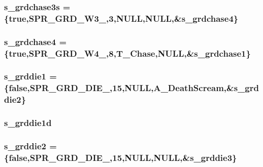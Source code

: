 \label{WL__ACT2_8C_a8bc87beffeb977a5c95f49302ac14a72}
\hypertarget{WL__ACT2_8C_add94e5dfbb86ff5e37cc5e00d5a09afe}{
\subsubsection[{s\_\-grdchase3s}]{ {\bf s\_\-grdchase3s} = \{true,SPR\_\-GRD\_\-W3\_,3,NULL,NULL,\&{\bf s\_\-grdchase4}\}}}
\label{WL__ACT2_8C_add94e5dfbb86ff5e37cc5e00d5a09afe}
\hypertarget{WL__ACT2_8C_a300ee63f6cbbc3b04ad6a46f8f553e5f}{
\subsubsection[{s\_\-grdchase4}]{ {\bf s\_\-grdchase4} = \{true,SPR\_\-GRD\_\-W4\_,8,T\_\-Chase,NULL,\&{\bf s\_\-grdchase1}\}}}
\label{WL__ACT2_8C_a300ee63f6cbbc3b04ad6a46f8f553e5f}
\hypertarget{WL__ACT2_8C_a24864a0aad4623326b4d7ca0ead6407e}{
\subsubsection[{s\_\-grddie1}]{ {\bf s\_\-grddie1} = \{false,SPR\_\-GRD\_\-DIE\_,15,NULL,A\_\-DeathScream,\&{\bf s\_\-grddie2}\}}}
\label{WL__ACT2_8C_a24864a0aad4623326b4d7ca0ead6407e}
\hypertarget{WL__ACT2_8C_a333b92e2a38649b0efd2140520af9558}{
\subsubsection[{s\_\-grddie1d}]{ {\bf s\_\-grddie1d}}}
\label{WL__ACT2_8C_a333b92e2a38649b0efd2140520af9558}
\hypertarget{WL__ACT2_8C_a35c17f538a7e09ae3511a12e8b401e1f}{
\subsubsection[{s\_\-grddie2}]{ {\bf s\_\-grddie2} = \{false,SPR\_\-GRD\_\-DIE\_,15,NULL,NULL,\&{\bf s\_\-grddie3}\}}}
